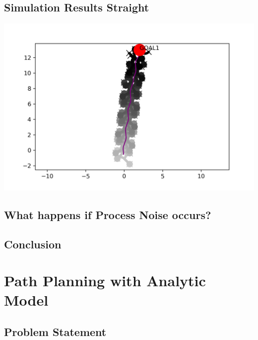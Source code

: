 \documentclass[10pt,a4paper]{article}
\begin{document}
\subsection{Simulation Results Straight}
\includegraphics[width=.95\textwidth]{pics/pathplanner_without_noise/example_straight/gait.png}


\subsection{What happens if Process Noise occurs?}



\subsection{Conclusion}




\section{Path Planning with Analytic Model}

\subsection{Problem Statement}
\end{document}
